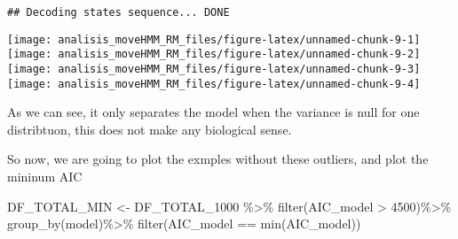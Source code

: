\documentclass[
]{article}
\newenvironment{Shaded}{\begin{snugshade}}{\end{snugshade}}
\newcommand{\DecValTok}[1]{\textcolor[rgb]{0.00,0.00,0.81}{#1}}
\newcommand{\FunctionTok}[1]{\textcolor[rgb]{0.00,0.00,0.00}{#1}}
\newcommand{\NormalTok}[1]{#1}
\newcommand{\OtherTok}[1]{\textcolor[rgb]{0.56,0.35,0.01}{#1}}
\newcommand{\SpecialCharTok}[1]{\textcolor[rgb]{0.00,0.00,0.00}{#1}}
\begin{document}
\begin{verbatim}
## Decoding states sequence... DONE
\end{verbatim}

\texttt{[image: analisis\_moveHMM\_RM\_files/figure-latex/unnamed-chunk-9-1]}
\texttt{[image: analisis\_moveHMM\_RM\_files/figure-latex/unnamed-chunk-9-2]}
\texttt{[image: analisis\_moveHMM\_RM\_files/figure-latex/unnamed-chunk-9-3]}
\texttt{[image: analisis\_moveHMM\_RM\_files/figure-latex/unnamed-chunk-9-4]}

As we can see, it only separates the model when the variance is null for
one distribtuon, this does not make any biological sense.

So now, we are going to plot the exmples without these outliers, and
plot the mininum AIC

\begin{Shaded}
\begin{Highlighting}[]
\NormalTok{DF\_TOTAL\_MIN }\OtherTok{\textless{}{-}}\NormalTok{ DF\_TOTAL\_1000 }\SpecialCharTok{\%\textgreater{}\%}
  \FunctionTok{filter}\NormalTok{(AIC\_model }\SpecialCharTok{\textgreater{}} \DecValTok{4500}\NormalTok{)}\SpecialCharTok{\%\textgreater{}\%}
  \FunctionTok{group\_by}\NormalTok{(model)}\SpecialCharTok{\%\textgreater{}\%}
  \FunctionTok{filter}\NormalTok{(AIC\_model }\SpecialCharTok{==} \FunctionTok{min}\NormalTok{(AIC\_model))}
\end{Highlighting}
\end{Shaded}
\end{document}
